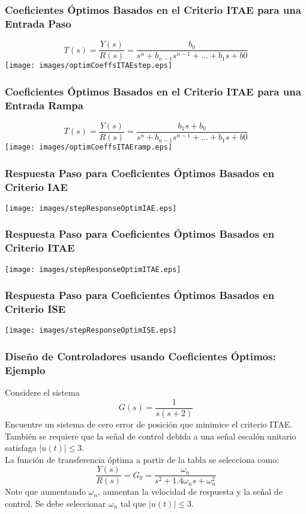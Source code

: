 \documentclass[aspectratio=169,handout]{beamer}
\theoremstyle{definition}
\theoremstyle{plain}
\theoremstyle{remark}
\begin{document}
\begin{frame}[<+->]\frametitle{Coeficientes Óptimos Basados en el Criterio ITAE para una Entrada Paso}
\centering
\begin{equation*}
	T(s) = \frac{Y(s)}{R(s)} = \frac{b_0}{s^n + b_{n-1} s^{n-1} + \dots + b_1 s + b0}
\end{equation*}
\vspace*{10mm}
\texttt{[image: images/optimCoeffsITAEstep.eps]}
\end{frame}

\begin{frame}[<+->]\frametitle{Coeficientes Óptimos Basados en el Criterio ITAE para una Entrada Rampa}
\centering
\begin{equation*}
	T(s) = \frac{Y(s)}{R(s)} = \frac{b_1s + b_0}{s^n + b_{n-1} s^{n-1} + \dots + b_1 s + b0}
\end{equation*}
\vspace*{10mm}
\texttt{[image: images/optimCoeffsITAEramp.eps]} 
\end{frame}

\begin{frame}[c]\frametitle{Respuesta Paso para Coeficientes Óptimos Basados en Criterio IAE}
\vspace*{5mm}
\centering
\texttt{[image: images/stepResponseOptimIAE.eps]}
\end{frame}

\begin{frame}[c]\frametitle{Respuesta Paso para Coeficientes Óptimos Basados en Criterio ITAE}
\vspace*{5mm}
\centering
\texttt{[image: images/stepResponseOptimITAE.eps]}
\end{frame}

\begin{frame}[c]\frametitle{Respuesta Paso para Coeficientes Óptimos Basados en Criterio ISE}
\vspace*{5mm}
\centering
\texttt{[image: images/stepResponseOptimISE.eps]}
\end{frame}

\begin{frame}[<+->]\frametitle{Diseño de Controladores usando Coeficientes Óptimos: Ejemplo}
Considere el sistema
\begin{equation*}
	G(s) = \frac{1}{s(s+2)}
\end{equation*}
Encuentre un sistema de cero error de posición que minimice el criterio ITAE. También se requiere que la señal de control debida a una señal escalón unitario satisfaga $|u(t)| \leq 3$.\\
\vspace*{3mm}
La función de transferencia óptima a partir de la tabla se selecciona como:
\begin{equation*}
	\frac{Y(s)}{R(s)} = G_0 = \frac{\omega_n}{s^2 + 1.4 \omega_n s + \omega_n^2}
\end{equation*}
Note que aumentando $\omega_n$, aumentan la velocidad de respuesta y la señal de control. Se debe seleccionar $\omega_n$ tal que $|u(t)| \leq 3$.
\end{frame}
\end{document}
